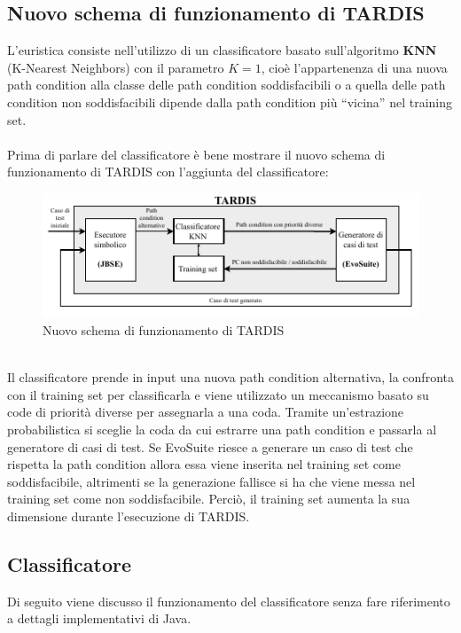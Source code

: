 \documentclass[a4paper, 12pt, oneside]{book}
\newcommand{\qq}[1]{``#1''}
\theoremstyle{normal}
\begin{document}
\subsection{Nuovo schema di funzionamento di TARDIS}
L'euristica consiste nell'utilizzo di un classificatore basato sull'algoritmo \textbf{KNN} (K-Nearest Neighbors) con il parametro $K = 1$, cioè l'appartenenza di una nuova path condition alla classe delle path condition soddisfacibili o a quella delle path condition non soddisfacibili dipende dalla path condition più \qq{vicina} nel training set.
\\ \\ Prima di parlare del classificatore è bene mostrare il nuovo schema di funzionamento di TARDIS con l'aggiunta del classificatore: 
\begin{figure}[h]
  \centering
  \includegraphics[width=\textwidth]{img/tardis-diagram-classifier.pdf}
  \caption{Nuovo schema di funzionamento di TARDIS}
  \label{diagram:tardis-workflow-classifier}
\end{figure}
\\ Il classificatore prende in input una nuova path condition alternativa, la confronta con il training set per classificarla e viene utilizzato un meccanismo basato su code di priorità diverse per assegnarla a una coda. Tramite un'estrazione probabilistica si sceglie la coda da cui estrarre una path condition e passarla al generatore di casi di test. Se EvoSuite riesce a generare un caso di test che rispetta la path condition allora essa viene inserita nel training set come soddisfacibile, altrimenti se la generazione fallisce si ha che viene messa nel training set come non soddisfacibile. Perciò, il training set aumenta la sua dimensione durante l'esecuzione di TARDIS.

\clearpage
\subsection{Classificatore}
Di seguito viene discusso il funzionamento del classificatore senza fare riferimento a dettagli implementativi di Java.
\end{document}
